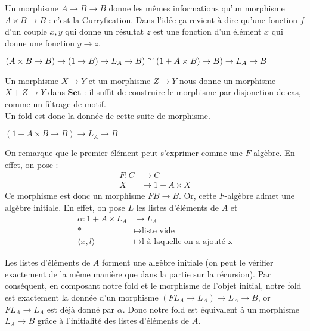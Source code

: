 \documentclass{article}
\begin{document}
Un morphisme $A \rightarrow B \rightarrow B$ donne les mêmes informations qu'un morphisme $ A \times B \rightarrow B$ : c'est la Curryfication. Dans l'idée ça revient à dire qu'une fonction $f$ d'un couple $x,y$ qui donne un résultat $z$ est une fonction d'un élément $x$ qui donne une fonction $y \rightarrow z$.

\begin{center}
    $(A \times B \rightarrow B) \rightarrow (1 \rightarrow B) \rightarrow L_A \rightarrow B) \cong \\ 
    (1 + A \times B ) \rightarrow B) \rightarrow L_A \rightarrow B  $
\end{center}
Un morphisme $X \rightarrow Y$ et un morphisme $ Z \rightarrow Y$ nous donne un morphisme $X + Z \rightarrow Y$ dans $\mathbf{Set}$ : il suffit de construire le morphisme par disjonction de cas, comme un filtrage de motif. \\ 

Un fold est donc la donnée de cette suite de morphisme. 
\begin{center}
    $ (1 + A \times B \rightarrow B) \rightarrow L_A \rightarrow B$ 
\end{center}

On remarque que le premier élément peut s'exprimer comme une $F$-algèbre. En effet, on pose :  
\begin{align*}
    F : C & \rightarrow C \\
        X & \mapsto 1 + A \times X 
\end{align*}
Ce morphisme est donc un morphisme $ FB \rightarrow B$. Or, cette $F$-algèbre admet une algèbre initiale. En effet, on pose $L$ les listes d'éléments de $A$ et 
\begin{align*}
    \alpha : 1 + A \times L_A & \rightarrow L_A \\ 
    * & \mapsto \text{liste vide} \\
    \langle x, l \rangle & \mapsto \text{l à laquelle on a ajouté x}
\end{align*}

Les listes d'éléments de $A$ forment une algèbre initiale (on peut le vérifier exactement de la même manière que dans la partie sur la récursion). Par conséquent, en composant notre fold et le morphisme de l'objet initial, notre fold est exactement la donnée  d'un morphisme $(FL_A \rightarrow L_A) \rightarrow L_A \rightarrow B $, or $FL_A \rightarrow L_A$ est déjà donné par $\alpha$. Donc notre fold est équivalent à un morphisme $L_A \rightarrow B$ grâce à l'initialité des listes d'éléments de $A$.
\end{document}
